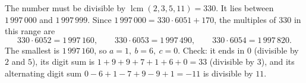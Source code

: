 The number must be divisible by $\operatorname{lcm}(2,3,5,11)=330$. It lies between $1\,997\,000$ and $1\,997\,999$. Since $1\,997\,000=330\cdot6051+170$, the multiples of $330$ in this range are
\[
330\cdot6052=1\,997\,160,\qquad 330\cdot6053=1\,997\,490,\qquad 330\cdot6054=1\,997\,820 .
\]
The smallest is $1\,997\,160$, so $\boxed{a=1,\ b=6,\ c=0}$. Check: it ends in $0$ (divisible by $2$ and $5$), its digit sum is $1+9+9+7+1+6+0=33$ (divisible by $3$), and its alternating digit sum $0-6+1-7+9-9+1=-11$ is divisible by $11$.
